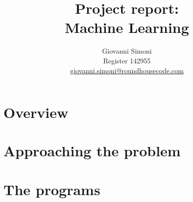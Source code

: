 \documentclass[10pt,a4paper]{article}
\title {
    Project report:\\
    Machine Learning
}
\author{
    Giovanni Simoni\\
    Register 142955\\
    \href{mailto:giovanni.simoni@roundhousecode.com}
         {giovanni.simoni@roundhousecode.com}
}
\begin{document}
    \maketitle

    \tableofcontents

    \newpage
    \section{ Overview } \label{sec:Overview}
    

    \section{ Approaching the problem } \label{sec:Approaching-the-problem}
    

    \section{ The programs } \label{sec:Programs}
    
\end{document}
